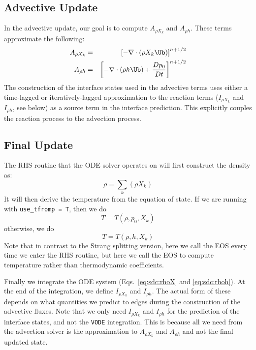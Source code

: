 \subsection{Advective Update}

In the advective update, our goal is to compute $A_{\rho X_k}$ and
$A_{\rho h}$.  These terms approximate the following:
\begin{eqnarray}
A_{\rho X_k} &=&  \left [- \nabla \cdot (\rho X_k \Ub) \right ]^{n+1/2} \\
A_{\rho h}   &=&  \left [- \nabla \cdot (\rho h \Ub) + \frac{Dp_0}{Dt} \right ]^{n+1/2}
\end{eqnarray}
The construction of the interface states used in the advective terms
uses either a time-lagged or iteratively-lagged approximation to the reaction
terms ($I_{\rho X_k}$ and $I_{\rho h}$, see below) as a source term in the interface
prediction.  This explicitly couples the reaction process to the
advection process.


\subsection{Final Update}

The RHS routine that the ODE solver operates on will first construct
the density as:
\begin{equation}
\rho = \sum_k (\rho X_k)
\end{equation}
It will then derive the temperature from the equation of state.  If we
are running with {\tt use\_tfromp = T}, then we do
\begin{equation}
T = T(\rho, p_0, X_k)
\end{equation}
otherwise, we do
\begin{equation}
T = T(\rho, h, X_k)
\end{equation}
Note that in contrast to the Strang splitting version, here we call the EOS
every time we enter the RHS routine, but here we call the EOS to compute temperature
rather than thermodynamic coefficients.

Finally we integrate the ODE system (Eqs.~\ref{eq:sdc:rhoX} and \ref{eq:sdc:rhoh}).
At the end of the integration, we define $I_{\rho X_k}$ and $I_{\rho h}$.  The actual 
form of these depends on what quantities we predict to edges during 
the construction of the advective fluxes.
Note that we only need $I_{\rho X_k}$ and $I_{\rho h}$ for the
prediction of the interface states, and not the {\tt VODE} integration.
This is because all we need from the advection solver is the
approximation to $A_{\rho X_k}$ and $A_{\rho h}$ and not the final
updated state.

